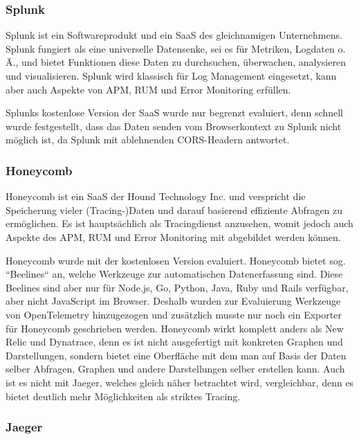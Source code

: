 \subsubsection{Splunk}

Splunk \cite{Splunk} ist ein Softwareprodukt und ein SaaS des gleichnamigen Unternehmens. Splunk fungiert als eine universelle Datensenke, sei es für Metriken, Logdaten o. Ä., und bietet Funktionen diese Daten zu durchsuchen, überwachen, analysieren und visualisieren. Splunk wird klassisch für Log Management eingesetzt, kann aber auch Aspekte von APM, RUM und Error Monitoring erfüllen.

Splunks kostenlose Version der SaaS wurde nur begrenzt evaluiert, denn schnell wurde festgestellt, dass das Daten senden vom Browserkontext zu Splunk nicht möglich ist, da Splunk mit ablehnenden CORS-Headern antwortet.

\subsubsection{Honeycomb}

Honeycomb \cite{Honeycomb} ist ein SaaS der Hound Technology Inc. und verspricht die Speicherung vieler (Tracing-)Daten und darauf basierend effiziente Abfragen zu ermöglichen. Es ist hauptsächlich als Tracingdienst anzusehen, womit jedoch auch Aspekte des APM, RUM und Error Monitoring mit abgebildet werden können.

Honeycomb wurde mit der kostenlosen Version evaluiert. Honeycomb bietet sog. ``Beelines`` an, welche Werkzeuge zur automatischen Datenerfassung sind. Diese Beelines sind aber nur für Node.js, Go, Python, Java, Ruby und Rails verfügbar, aber nicht JavaScript im Browser. Deshalb wurden zur Evaluierung Werkzeuge von OpenTelemetry hinzugezogen und zusätzlich musste nur noch ein Exporter für Honeycomb geschrieben werden. Honeycomb wirkt komplett anders als New Relic und Dynatrace, denn es ist nicht ausgefertigt mit konkreten Graphen und Darstellungen, sondern bietet eine Oberfläche mit dem man auf Basis der Daten selber Abfragen, Graphen und andere Darstellungen selber erstellen kann. Auch ist es nicht mit Jaeger, welches gleich näher betrachtet wird, vergleichbar, denn es bietet deutlich mehr Möglichkeiten als striktes Tracing.

\subsubsection{Jaeger}


